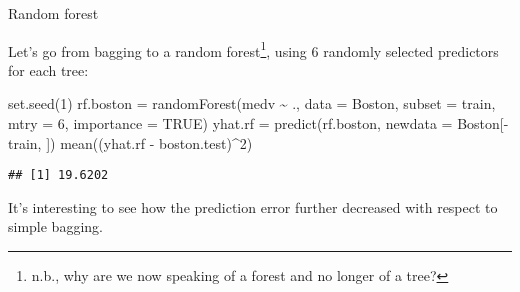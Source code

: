\documentclass[
  10pt,
  ignorenonframetext,
]{beamer}
\newenvironment{Shaded}{\begin{snugshade}}{\end{snugshade}}
\newcommand{\AttributeTok}[1]{\textcolor[rgb]{0.77,0.63,0.00}{#1}}
\newcommand{\ConstantTok}[1]{\textcolor[rgb]{0.00,0.00,0.00}{#1}}
\newcommand{\DecValTok}[1]{\textcolor[rgb]{0.00,0.00,0.81}{#1}}
\newcommand{\FunctionTok}[1]{\textcolor[rgb]{0.00,0.00,0.00}{#1}}
\newcommand{\NormalTok}[1]{#1}
\newcommand{\OtherTok}[1]{\textcolor[rgb]{0.56,0.35,0.01}{#1}}
\newcommand{\SpecialCharTok}[1]{\textcolor[rgb]{0.00,0.00,0.00}{#1}}
\begin{document}
\begin{frame}[fragile]
\begin{block}{Random forest}
\protect\hypertarget{random-forest}{}
\(~\)

Let's go from bagging to a random
forest\footnote{n.b., why are we now speaking of a forest and no longer of a tree?},
using 6 randomly selected predictors for each tree:

\vspace{2mm}

\scriptsize

\begin{Shaded}
\begin{Highlighting}[]
\FunctionTok{set.seed}\NormalTok{(}\DecValTok{1}\NormalTok{)}
\NormalTok{rf.boston }\OtherTok{=} \FunctionTok{randomForest}\NormalTok{(medv }\SpecialCharTok{\textasciitilde{}}\NormalTok{ ., }\AttributeTok{data =}\NormalTok{ Boston, }\AttributeTok{subset =}\NormalTok{ train, }\AttributeTok{mtry =} \DecValTok{6}\NormalTok{,}
    \AttributeTok{importance =} \ConstantTok{TRUE}\NormalTok{)}
\NormalTok{yhat.rf }\OtherTok{=} \FunctionTok{predict}\NormalTok{(rf.boston, }\AttributeTok{newdata =}\NormalTok{ Boston[}\SpecialCharTok{{-}}\NormalTok{train, ])}
\FunctionTok{mean}\NormalTok{((yhat.rf }\SpecialCharTok{{-}}\NormalTok{ boston.test)}\SpecialCharTok{\^{}}\DecValTok{2}\NormalTok{)}
\end{Highlighting}
\end{Shaded}

\begin{verbatim}
## [1] 19.6202
\end{verbatim}

\vspace{2mm}
\normalsize

It's interesting to see how the prediction error further decreased with
respect to simple bagging.
\end{block}
\end{frame}
\end{document}
